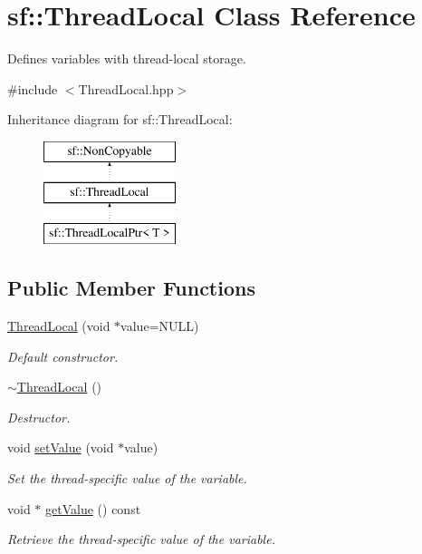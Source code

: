 \hypertarget{classsf_1_1_thread_local}{}\section{sf\+:\+:Thread\+Local Class Reference}
\label{classsf_1_1_thread_local}


Defines variables with thread-\/local storage.  




{\ttfamily \#include $<$Thread\+Local.\+hpp$>$}

Inheritance diagram for sf\+:\+:Thread\+Local\+:\begin{figure}[H]
\begin{center}
\leavevmode
\includegraphics[height=3.000000cm]{classsf_1_1_thread_local}
\end{center}
\end{figure}
\subsection*{Public Member Functions}
\begin{DoxyCompactItemize}
\item 
\mbox{\hyperlink{classsf_1_1_thread_local_a44ea3c4be4eef118080275cbf4cf04cd}{Thread\+Local}} (void $\ast$value=N\+U\+LL)
\begin{DoxyCompactList}\small\item\em Default constructor. \end{DoxyCompactList}\item 
\mbox{\hyperlink{classsf_1_1_thread_local_acc612bddfd0f0507b1c5da8b3b8c75c2}{$\sim$\+Thread\+Local}} ()
\begin{DoxyCompactList}\small\item\em Destructor. \end{DoxyCompactList}\item 
void \mbox{\hyperlink{classsf_1_1_thread_local_ab7e334c83d77644a8e67ee31c3230007}{set\+Value}} (void $\ast$value)
\begin{DoxyCompactList}\small\item\em Set the thread-\/specific value of the variable. \end{DoxyCompactList}\item 
void $\ast$ \mbox{\hyperlink{classsf_1_1_thread_local_ad68823496eb065b4b695c3468fa869bc}{get\+Value}} () const
\begin{DoxyCompactList}\small\item\em Retrieve the thread-\/specific value of the variable. \end{DoxyCompactList}\end{DoxyCompactItemize}
